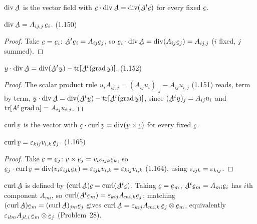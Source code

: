 \begin{definition}\label{def:divA}
$\dvg\bA$ is the vector field with $\ip\bc{\dvg\bA}=\dvg(\bA^{t}\bc)$ for
every fixed $\bc$.
\end{definition}

\begin{proposition}\label{prop:divA}
$\dvg\bA=A_{ij,j}\,\be_i$. \hfill\textup{(1.150)}
\end{proposition}

\begin{proof}
Take $\bc=\be_i$: $\bA^{t}\be_i=A_{ij}\be_j$, so
$\ip{\be_i}{\dvg\bA}=\dvg(A_{ij}\be_j)=A_{ij,j}$ ($i$ fixed, $j$ summed).
\end{proof}

\begin{proposition}\label{prop:divprod}
$\ip\bu{\dvg\bA}=\dvg(\bA^{t}\bu)-\tr[\bA^{t}(\grad\bu)]$. \hfill\textup{(1.152)}
\end{proposition}

\begin{proof}
The scalar product rule $u_iA_{ij,j}=(A_{ij}u_i)_{,j}-A_{ij}u_{i,j}$
(1.151) reads, term by term, $\ip\bu{\dvg\bA}=\dvg(\bA^{t}\bu)
-\tr[\bA^{t}(\grad\bu)]$, since $(\bA^{t}\bu)_j=A_{ij}u_i$ and
$\tr[\bA^{t}\grad\bu]=A_{ij}u_{i,j}$.
\end{proof}

\begin{definition}\label{def:curlv}
$\crl\bv$ is the vector with $\ip\bc{\crl\bv}=\dvg(\bv\times\bc)$ for every
fixed $\bc$.
\end{definition}

\begin{proposition}\label{prop:curlv}
$\crl\bv=\eps_{kij}v_{i,k}\,\be_j$. \hfill\textup{(1.165)}
\end{proposition}

\begin{proof}
Take $\bc=\be_j$: $\bv\times\be_j=v_i\eps_{ijk}\be_k$, so
$\ip{\be_j}{\crl\bv}=\dvg(v_i\eps_{ijk}\be_k)=\eps_{ijk}v_{i,k}
=\eps_{kij}v_{i,k}$ (1.164), using $\varepsilon_{ijk}=\varepsilon_{kij}$.
\end{proof}

\begin{remark}\label{rem:curlA}
$\crl\bA$ is defined by $(\crl\bA)\bc=\crl(\bA^{t}\bc)$. Taking
$\bc=\be_m$, $\bA^{t}\be_m=A_{mi}\be_i$ has $i$th component $A_{mi}$, so
$\crl(\bA^{t}\be_m)=\eps_{kij}A_{mi,k}\be_j$; matching
$(\crl\bA)\be_m=(\crl\bA)_{jm}\be_j$ gives
$\crl\bA=\eps_{kij}A_{mi,k}\,\be_j\otimes\be_m$, equivalently
$\eps_{ilm}A_{jl,i}\,\be_m\otimes\be_j$ (Problem~28).
\end{remark}

